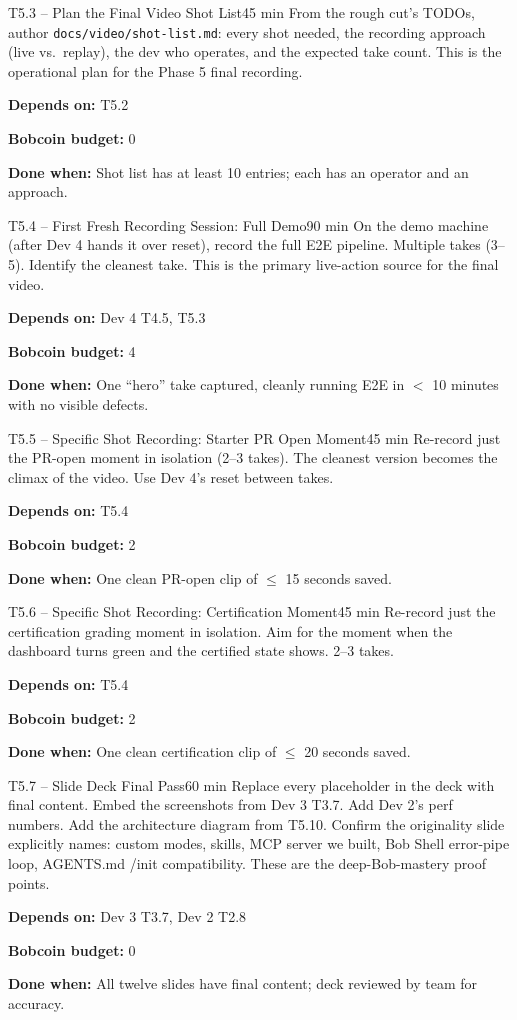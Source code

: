 \documentclass[11pt,letterpaper]{article}
\newcommand{\acceptance}[1]{\par\smallskip\textcolor{ibmgreen}{\textbf{Done when:}} #1}
\newcommand{\depends}[1]{\par\smallskip\textcolor{ibmorange}{\textbf{Depends on:}} #1}
\newcommand{\bobcost}[1]{\par\smallskip\textcolor{ibmaccent}{\textbf{Bobcoin budget:}} #1}
\begin{document}
\begin{task}{T5.3 -- Plan the Final Video Shot List}{45 min}
From the rough cut's TODOs, author \texttt{docs/video/shot-list.md}: every shot needed, the recording approach (live vs.~replay), the dev who operates, and the expected take count. This is the operational plan for the Phase 5 final recording.
\depends{T5.2}
\bobcost{0}
\acceptance{Shot list has at least 10 entries; each has an operator and an approach.}
\end{task}

\begin{task}{T5.4 -- First Fresh Recording Session: Full Demo}{90 min}
On the demo machine (after Dev 4 hands it over reset), record the full E2E pipeline. Multiple takes (3--5). Identify the cleanest take. This is the primary live-action source for the final video.
\depends{Dev 4 T4.5, T5.3}
\bobcost{4}
\acceptance{One ``hero'' take captured, cleanly running E2E in $<$ 10 minutes with no visible defects.}
\end{task}

\begin{task}{T5.5 -- Specific Shot Recording: Starter PR Open Moment}{45 min}
Re-record just the PR-open moment in isolation (2--3 takes). The cleanest version becomes the climax of the video. Use Dev 4's reset between takes.
\depends{T5.4}
\bobcost{2}
\acceptance{One clean PR-open clip of $\leq$ 15 seconds saved.}
\end{task}

\begin{task}{T5.6 -- Specific Shot Recording: Certification Moment}{45 min}
Re-record just the certification grading moment in isolation. Aim for the moment when the dashboard turns green and the certified state shows. 2--3 takes.
\depends{T5.4}
\bobcost{2}
\acceptance{One clean certification clip of $\leq$ 20 seconds saved.}
\end{task}

\begin{task}{T5.7 -- Slide Deck Final Pass}{60 min}
Replace every placeholder in the deck with final content. Embed the screenshots from Dev 3 T3.7. Add Dev 2's perf numbers. Add the architecture diagram from T5.10. Confirm the originality slide explicitly names: custom modes, skills, MCP server we built, Bob Shell error-pipe loop, AGENTS.md /init compatibility. These are the deep-Bob-mastery proof points.
\depends{Dev 3 T3.7, Dev 2 T2.8}
\bobcost{0}
\acceptance{All twelve slides have final content; deck reviewed by team for accuracy.}
\end{task}
\end{document}
